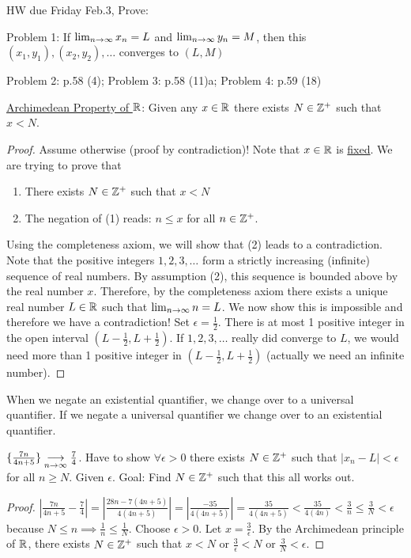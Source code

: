 \documentclass[]{article}
\begin{document}
HW due Friday Feb.3, Prove:

Problem 1: If $\lim_{n\rightarrow\infty} x_n=L$ and $\lim_{n\rightarrow\infty}y_n=M$, then this $(x_1,y_1),(x_2,y_2),\dots$ converges to $(L,M)$

Problem 2: p.58 (4); 
Problem 3: p.58 (11)a; 
Problem 4: p.59 (18)

\begin{proposition}
	\ul{Archimedean Property of $\mathbb{R}$}: Given any $x\in\mathbb{R}$ there exists $N\in\mathbb{Z}^+$ such that $x<N$.
\end{proposition}

\begin{proof}
	Assume otherwise (proof by contradiction)! Note that $x\in\mathbb{R}$ is \ul{fixed}. We are trying to prove that
	\begin{enumerate}
		\item There exists $N\in\mathbb{Z}^+$ such that $x<N$
		\item The negation of (1) reads: $n\leq x$ for all $n\in\mathbb{Z}^+$. 
	\end{enumerate}
	Using the completeness axiom, we will show that (2) leads to a contradiction.
	Note that the positive integers $1,2,3,\dots$ form  a strictly increasing (infinite) sequence of real numbers.
	By assumption (2), this sequence is bounded above by the real  number $x$. Therefore, by the completeness axiom there exists a unique real number $L\in \mathbb{R}$ such that $\lim_{n\rightarrow\infty} n = L$. We now show this is impossible and therefore we have a contradiction! Set $\epsilon=\frac{1}{2}$. There is at most 1 positive integer in the open interval $(L-\frac{1}{2},L+\frac{1}{2})$.
	If $1,2,3,\dots$ really did converge to $L$, we would need more than 1 positive integer in $(L-\frac{1}{2},L+\frac{1}{2})$ (actually we need an infinite number).
\end{proof}
\begin{note}
	When we negate an existential quantifier, we change over to a universal quantifier. If we negate a universal quantifier we change over to an existential quantifier.
\end{note}

\begin{proposition}
	$\{\frac{7n}{4n+5}\} \underset{n\rightarrow\infty}{\longrightarrow} \frac{7}{4}$. Have to show $\forall\epsilon>0$ there exists $N\in\mathbb{Z}^+$ such that $|x_n-L|<\epsilon$ for all $n\geq N$. Given $\epsilon$. Goal: Find $N\in\mathbb{Z}^+$ such that this all works out.
\end{proposition}
\begin{proof}
	$|\frac{7n}{4n+5}-\frac{7}{4}|=|\frac{28n-7(4n+5)}{4(4n+5)}|=|\frac{-35}{4(4n+5)}|=\frac{35}{4(4n+5)} < \frac{35}{4(4n)}<\frac{3}{n}\leq \frac{3}{N}<\epsilon$ because $N\leq n\implies \frac{1}{n}\leq\frac{1}{N}$. Choose $\epsilon>0$. Let $x=\frac{3}{\epsilon}$. By the Archimedean principle of $\mathbb{R}$, there exists $N\in\mathbb{Z}^+$ such that $x<N$ or $\frac{3}{\epsilon}<N$ or $\frac{3}{N}<\epsilon$.
\end{proof}
\end{document}
